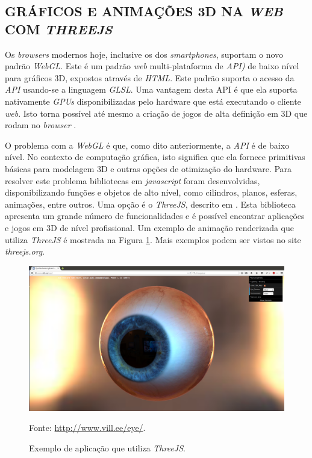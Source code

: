 \subsection{GRÁFICOS E ANIMAÇÕES 3D NA \emph{WEB} COM \emph{THREEJS}} 
\label{threejs_sec}
Os \emph{browsers} modernos hoje, inclusive os dos \emph{smartphones}, suportam o novo padrão \emph{WebGL}. 
Este é um padrão \emph{web} multi-plataforma de \emph{API)} de baixo nível para gráficos 3D, expostos através de \emph{HTML}. 
Este padrão suporta o acesso da \emph{API} usando-se a linguagem \emph{GLSL}. 
Uma vantagem desta API é que ela suporta nativamente \emph{GPUs} disponibilizadas pelo hardware que está executando o cliente \emph{web}. 
Isto torna possível até mesmo a criação de jogos de alta definição em 3D que rodam no \emph{browser} \cite{Matsuda2013}.

O problema com a \emph{WebGL} é que, como dito anteriormente, a \emph{API} é de baixo nível. 
No contexto de computação gráfica, isto significa que ela fornece primitivas básicas para modelagem 3D e outras opções de otimização do hardware.
Para resolver este problema bibliotecas em \emph{javascript} foram desenvolvidas, disponibilizando funções e objetos de alto nível, como cilindros, planos, esferas, animações, entre outros. 
Uma opção é o \emph{ThreeJS}, descrito em . 
Esta biblioteca apresenta um grande número de funcionalidades e é possível encontrar aplicações e jogos em 3D de nível profissional. 
Um exemplo de animação renderizada que utiliza \emph{ThreeJS} é mostrada na Figura \ref{evil_eye}.
Mais exemplos podem ser vistos no site \emph{threejs.org}.



\begin{figure}[ht]
	\centering
	\includegraphics[width=14cm]{figuras/evil_eye.eps}
	\caption{Exemplo de aplicação que utiliza \emph{ThreeJS}.}
	\label{evil_eye}
	\footnotesize Fonte: \url{http://www.vill.ee/eye/}.
\end{figure}


